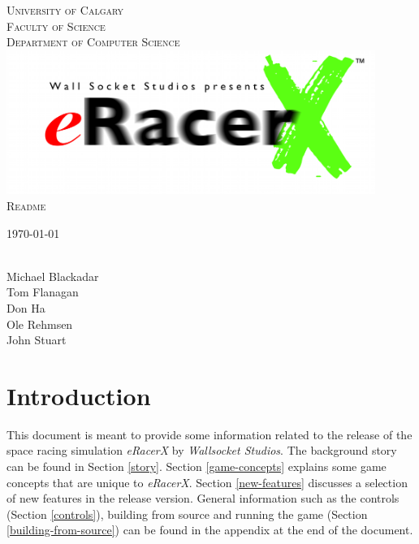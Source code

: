 \documentclass[11pt]{article}
\begin{document}
\begin{titlepage}
\begin{center}
\textsc{
%
University of Calgary\\
Faculty of Science\\
Department of Computer Science\\ 
}
\vspace{3cm}
%
%
{
\includegraphics[width=12cm]{img/eRacerX-Logo.png}\\
\textsc{
\Huge 
Readme
}
}
\vspace{5mm}


\vspace{5mm}
{
 \today \\
 \ \\
 }
%
\vfill %
%
%
\begin{flushright} 
Michael Blackadar \\
\vspace{3mm}
Tom Flanagan\\
\vspace{3mm}
Don Ha\\
\vspace{3mm}
Ole Rehmsen\\
\vspace{3mm}
John Stuart
\end{flushright}



\end{center}
\end{titlepage}

\label{introduction}
\section{Introduction}

This document is meant to provide some information related to the release of
the space racing simulation \emph{eRacerX} by \emph{Wallsocket Studios}. The
background story can be found in Section \ref{story}. Section
\ref{game-concepts} explains some game concepts that are unique to
\emph{eRacerX}. Section \ref{new-features} discusses a selection of new
features in the release version. General information such as the controls (Section \ref{controls}), building from source and running the game (Section \ref{building-from-source}) can be
found in the appendix at the end of the document.
\end{document}
